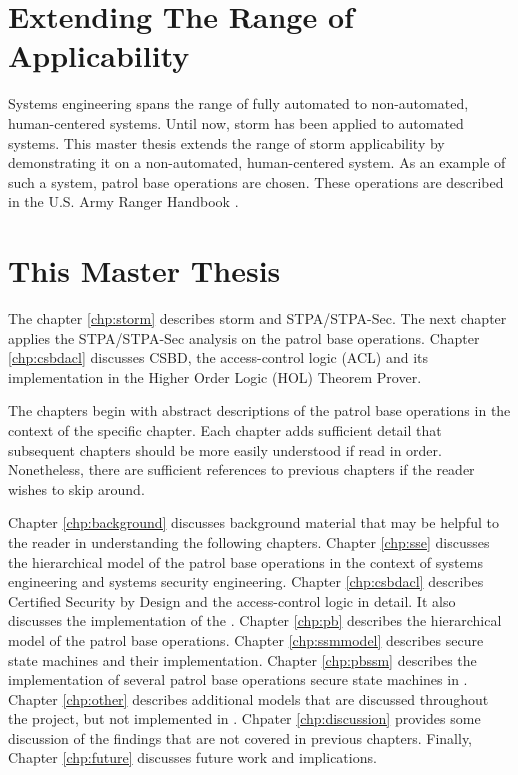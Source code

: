 \documentclass[../../main/main.tex]{subfiles}
\begin{document}
\section{Extending The Range of Applicability}\label{sec:intro:motivation}


Systems engineering spans the range of fully automated to non-automated, human-centered systems.  Until now, \gls{storm} has been applied to automated systems.  This master thesis extends the range of \gls{storm} applicability by demonstrating it on a non-automated, human-centered system.  As an example of such a system, patrol base operations are chosen.  These operations are described in the U.S. Army Ranger Handbook \cite{rangermanual}.   

\section{This Master Thesis}\label{sec:thismasterthesis}
The chapter \ref{chp:storm} describes \gls{storm} and STPA/STPA-Sec.  The next chapter applies the STPA/STPA-Sec analysis on the patrol base operations.  Chapter \ref{chp:csbdacl} discusses CSBD, the access-control logic (ACL) and its implementation in the Higher Order Logic (HOL) Theorem Prover.


  The chapters begin with abstract descriptions of the patrol base operations in the context of the specific chapter.  Each chapter adds sufficient detail that subsequent chapters should be more easily understood if read in order.  Nonetheless, there are sufficient references to previous chapters if the reader wishes to skip around.


Chapter \ref{chp:background} discusses background material that may be helpful to the reader in understanding the following chapters.  Chapter \ref{chp:sse} discusses the hierarchical model of the patrol base operations in the context of systems engineering and systems security engineering.  Chapter \ref{chp:csbdacl} describes Certified Security by Design and the access-control logic in detail.  It also discusses the  implementation of the .  Chapter \ref{chp:pb} describes the hierarchical model of the patrol base operations. Chapter \ref{chp:ssmmodel} describes secure state machines and their  implementation.  Chapter \ref{chp:pbssm} describes the implementation of several patrol base operations secure state machines in .  Chapter \ref{chp:other} describes additional models that are discussed throughout the project, but not implemented in .  Chpater \ref{chp:discussion} provides some discussion of the findings that are not covered in previous chapters.  Finally, Chapter \ref{chp:future} discusses future work and implications. 
\end{document}
